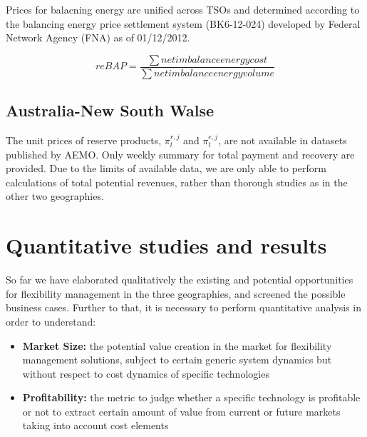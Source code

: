 

Prices for balacning energy are unified across TSOs and determined according to the  balancing energy price settlement system (BK6-12-024) developed by Federal Network Agency (FNA) as of 01/12/2012.

\begin{equation}
\label{eq:reBAP}
reBAP = \frac{\sum net imbalance energy cost}{\sum net imbalance energy volume}
\end{equation}

\subsection{Australia-New South Walse}
The unit prices of reserve products, $\pi_t^{r,j}$ and $\pi_t^{e,j}$, are not available in datasets published by AEMO. Only weekly summary for total payment and recovery are provided. Due to the limits of available data, we are only able to perform calculations of total potential revenues, rather than thorough studies as in the other two geographies.

\newpage

\section{Quantitative studies and results}
So far we have elaborated qualitatively the existing and potential opportunities for flexibility management in the three geographies, and screened the possible business cases. Further to that, it is necessary to perform quantitative analysis in order to understand:

\begin{itemize}
	\item \textbf{Market Size:} the potential value creation in the market for flexibility management solutions, subject to certain generic system dynamics but without respect to cost dynamics of specific technologies
	\item \textbf{Profitability:} the metric to judge whether a specific technology is profitable or not to extract certain amount of value from current or future markets taking into account cost elements
\end{itemize}

